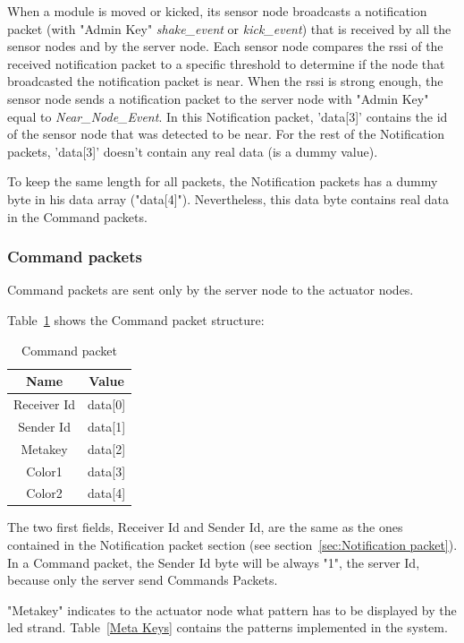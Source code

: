 When a module is moved or kicked, its sensor node broadcasts a notification packet (with "Admin Key" \emph{shake\_event} or \emph{kick\_event}) that is received by all the sensor nodes and by the server node. Each sensor node compares the rssi of the received notification packet to a specific threshold to determine if the node that broadcasted the notification packet is near. When the rssi is strong enough, the sensor node sends a notification packet to the server node with "Admin Key" equal to \emph{Near\_Node\_Event}. In this Notification packet, 'data[3]' contains the id of the sensor node that was detected to be near. For the rest of the Notification packets, 'data[3]' doesn't contain any real data (is a dummy value). 

To keep the same length for all packets, the Notification packets has a dummy byte in his data array ("data[4]"). Nevertheless, this data byte contains real data in the Command packets. 

\subsubsection{Command packets}
Command packets are sent only by the server node to the actuator nodes. 	

Table~\ref{Command-packet} shows the Command packet structure: 

\begin{table}[h]
  \centering
  \begin{tabular}{ c | c }
    \hline
    \textbf{Name} & \textbf{Value}\\ [0.5ex]    
    \hline
    Receiver Id & data[0] \\
    Sender Id & data[1] \\
    Metakey & data[2]\\
    Color1  & data[3]\\
    Color2 & data[4]\\ 	 
    \hline
  \end{tabular}
  \caption[Command packet]%
          {Command packet}
  \label{Command-packet}
\end{table}

The two first fields, Receiver Id and Sender Id, are the same as the ones contained in the Notification packet section (see section~\ref{sec:Notification packet}). In a Command packet, the Sender Id byte will be always "1", the server Id, because only the server send Commands Packets.

"Metakey" indicates to the actuator node what pattern has to be displayed by the led strand. Table~\ref{Meta Keys} contains the patterns implemented in the system.

